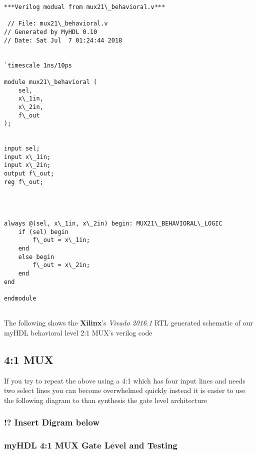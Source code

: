 \documentclass[11pt]{article}
\begin{document}
    \begin{Verbatim}[commandchars=\\\{\}]
***Verilog modual from mux21\_behavioral.v***

 // File: mux21\_behavioral.v
// Generated by MyHDL 0.10
// Date: Sat Jul  7 01:24:44 2018


`timescale 1ns/10ps

module mux21\_behavioral (
    sel,
    x\_1in,
    x\_2in,
    f\_out
);


input sel;
input x\_1in;
input x\_2in;
output f\_out;
reg f\_out;




always @(sel, x\_1in, x\_2in) begin: MUX21\_BEHAVIORAL\_LOGIC
    if (sel) begin
        f\_out = x\_1in;
    end
    else begin
        f\_out = x\_2in;
    end
end

endmodule


    \end{Verbatim}

    The following shows the \textbf{Xilinx}'s \emph{Vivado 2016.1} RTL
generated schematic of our myHDL behavioral level 2:1 MUX's verilog code

    \subsection{4:1 MUX}\label{mux}

    If you try to repeat the above using a 4:1 which has four input lines
and needs two select lines you can become overwhelmed quickly instead it
is easier to use the following diagram to than synthesis the gate level
architecture

    \subsubsection{!? Insert Digram below}\label{insert-digram-below}

    \subsubsection{myHDL 4:1 MUX Gate Level and
Testing}\label{myhdl-41-mux-gate-level-and-testing}
\end{document}
